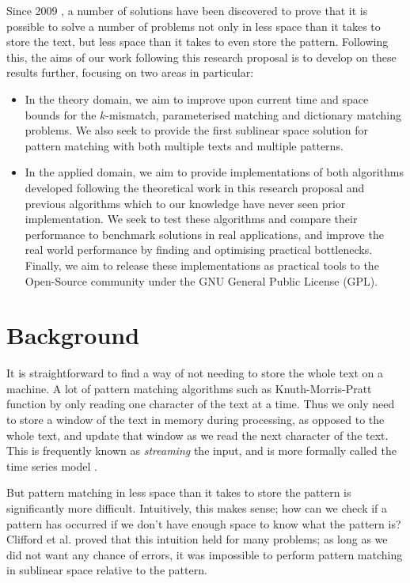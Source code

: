 \documentclass[a4paper,11pt]{article}
\begin{document}
    Since 2009 \cite{5438620}, a number of solutions have been discovered to prove that it is possible to solve a number of problems not only in less space than it takes to store the text, but less space than it takes to even store the pattern. Following this, the aims of our work following this research proposal is to develop on these results further, focusing on two areas in particular:

    \begin{itemize}
        \item In the theory domain, we aim to improve upon current time and space bounds for the $k$-mismatch, parameterised matching and dictionary matching problems. We also seek to provide the first sublinear space solution for pattern matching with both multiple texts and multiple patterns.
        \item In the applied domain, we aim to provide implementations of both algorithms developed following the theoretical work in this research proposal and previous algorithms which to our knowledge have never seen prior implementation. We seek to test these algorithms and compare their performance to benchmark solutions in real applications, and improve the real world performance by finding and optimising practical bottlenecks. Finally, we aim to release these implementations as practical tools to the Open-Source community under the GNU General Public License (GPL).
    \end{itemize}

    \section{Background}

    It is straightforward to find a way of not needing to store the whole text on a machine. A lot of pattern matching algorithms such as Knuth-Morris-Pratt \cite{kmp} function by only reading one character of the text at a time. Thus we only need to store a window of the text in memory during processing, as opposed to the whole text, and update that window as we read the next character of the text. This is frequently known as \textit{streaming} the input, and is more formally called the time series model \cite{TCS-002}.

    But pattern matching in less space than it takes to store the pattern is significantly more difficult. Intuitively, this makes sense; how can we check if a pattern has occurred if we don't have enough space to know what the pattern is? Clifford et al.\@ \cite{clifford:black-box} proved that this intuition held for many problems; as long as we did not want any chance of errors, it was impossible to perform pattern matching in sublinear space relative to the pattern.
\end{document}
